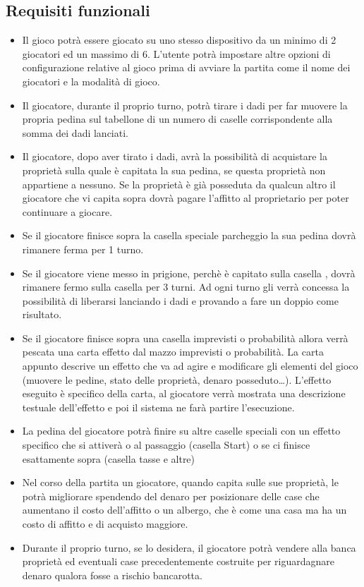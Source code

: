 \subsection{Requisiti funzionali}
\begin{itemize}
    \item Il gioco potrà essere giocato su uno stesso dispositivo da un minimo di 2 giocatori ed un massimo di 6. L'utente
    potrà impostare altre opzioni di configurazione relative al gioco prima di avviare la partita come il nome dei giocatori e 
    la modalità di gioco.
	\item Il giocatore, durante il proprio turno, potrà tirare i dadi per far muovere la propria pedina sul tabellone di un numero di 
    caselle corrispondente alla somma dei dadi lanciati.
	\item Il giocatore, dopo aver tirato i dadi, avrà la possibilità di acquistare la proprietà sulla quale 
    è capitata la sua pedina, se questa proprietà non appartiene a nessuno. 
    Se la proprietà è già posseduta da qualcun altro il giocatore che vi capita sopra dovrà pagare l’affitto al proprietario 
    per poter continuare a giocare.
    \item Se il giocatore finisce sopra la casella speciale parcheggio la sua pedina
    dovrà rimanere ferma per 1 turno.
    \item Se il giocatore viene messo in prigione, perchè è capitato sulla casella ,
    dovrà rimanere fermo sulla casella  per 3 turni. Ad ogni turno gli verrà concessa la possibilità di liberarsi lanciando i dadi
    e provando a fare un doppio come risultato.
    \item Se il giocatore finisce sopra una casella imprevisti o probabilità allora verrà pescata una carta effetto
    dal mazzo imprevisti o probabilità. La carta appunto descrive un effetto che va ad agire e modificare gli
    elementi del gioco (muovere le pedine, stato delle proprietà, denaro posseduto\dots). L'effetto eseguito è specifico della carta,
    al giocatore verrà mostrata una descrizione testuale dell'effetto e poi il sistema ne farà partire l'esecuzione.
    \item La pedina del giocatore potrà finire su altre caselle speciali con un effetto specifico che si attiverà o al 
    passaggio (casella Start) o se ci finisce esattamente sopra (casella tasse e altre)
    \item Nel corso della partita un giocatore, quando capita sulle sue proprietà, le potrà migliorare spendendo
    del denaro per posizionare delle case che aumentano il costo dell’affitto o un albergo, che è come una casa 
    ma ha un costo di affitto e di acquisto maggiore.
    \item Durante il proprio turno, se lo desidera, il giocatore potrà vendere alla banca 
    proprietà ed eventuali case precedentemente costruite per riguardagnare denaro qualora fosse a rischio
    bancarotta.
\end{itemize}


